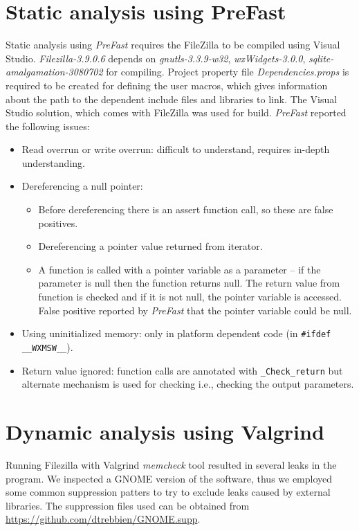 \documentclass[11pt]{article}
\begin{document}
\section{Static analysis using PreFast}
Static analysis using \textit{PreFast} requires the FileZilla to be compiled using Visual Studio. \textit{Filezilla-3.9.0.6} depends on \textit{gnutls-3.3.9-w32}, \textit{wxWidgets-3.0.0}, \textit{sqlite-amalgamation-3080702} for compiling. Project property file \textit{Dependencies.props} is required to be created for defining the user macros, which gives information about the path to the dependent include files and libraries to link. The Visual Studio solution, which comes with FileZilla was used for build. \textit{PreFast} reported the following issues:
\begin{itemize}[topsep=0pt, itemsep=0pt]
 \item Read overrun or write overrun: difficult to understand, requires in-depth understanding.
 \item Dereferencing a null pointer: 
	\begin{itemize}[topsep=0pt, itemsep=0pt]
		\item Before dereferencing there is an assert function call, so these are false positives.
		\item Dereferencing a pointer value returned from iterator.
		\item A function is called with a pointer variable as a parameter -- if the parameter is null then the function returns null. The return value from function is checked and if it is not null, the pointer variable is accessed. False positive reported by \textit{PreFast} that the pointer variable could be null.
	\end{itemize}
 \item Using uninitialized memory: only in platform dependent code (in \texttt{\#ifdef \_\_WXMSW\_\_}).
 \item Return value ignored: function calls are annotated with \texttt{\_Check\_return} but alternate mechanism is used for checking i.e., checking the output parameters.
\end{itemize}

\section{Dynamic analysis using Valgrind}

Running Filezilla with Valgrind \textit{memcheck} tool resulted in several leaks in the program. We inspected a GNOME version of the software, thus we employed some common suppression patters to try to exclude leaks caused by external libraries. The suppression files used can be obtained from \url{https://github.com/dtrebbien/GNOME.supp}.
\end{document}
